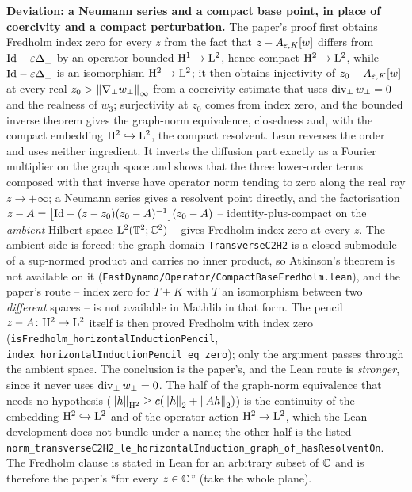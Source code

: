 \textbf{Deviation: a Neumann series and a compact base point, in place of coercivity and a
compact perturbation.}  The paper's proof first obtains Fredholm index zero for every $z$
from the fact that $z-A_{\varepsilon,K}[w]$ differs from $\mathrm{Id}-\varepsilon\Delta_\perp$ by an operator
bounded $\mathrm{H}^1\to\mathrm{L}^2$, hence compact $\mathrm{H}^2\to\mathrm{L}^2$, while $\mathrm{Id}-\varepsilon\Delta_\perp$ is an
isomorphism $\mathrm{H}^2\to\mathrm{L}^2$; it then obtains injectivity of $z_0-A_{\varepsilon,K}[w]$ at every
real $z_0>\left\|\nabla_\perp w_\perp\right\|_\infty$ from a coercivity estimate that uses
$\operatorname{div}_\perp w_\perp=0$ and the realness of $w_3$; surjectivity at $z_0$ comes from index
zero, and the bounded inverse theorem gives the graph-norm equivalence, closedness and,
with the compact embedding $\mathrm{H}^2\hookrightarrow\mathrm{L}^2$, the compact resolvent.  Lean
reverses the order and uses neither ingredient.  It inverts the diffusion part exactly as a Fourier multiplier on the graph
space and shows that the three lower-order terms composed with that inverse have operator
norm tending to zero along the real ray $z\to+\infty$; a Neumann series gives a resolvent
point directly, and the factorisation
$z-A=\bigl[\mathrm{Id}+(z-z_0)(z_0-A)^{-1}\bigr](z_0-A)$ -- identity-plus-compact on the
\emph{ambient} Hilbert space $\mathrm{L}^2(\mathbb{T}^2;\mathbb{C}^2)$ -- gives Fredholm index zero at every $z$.
The ambient side is forced: the graph domain \texttt{TransverseC2H2} is a closed submodule
of a sup-normed product and carries no inner product, so Atkinson's theorem is not available
on it (\texttt{FastDynamo/Operator/CompactBaseFredholm.lean}), and the paper's route --
index zero for $T+K$ with $T$ an isomorphism between two \emph{different} spaces -- is not
available in Mathlib in that form.  The pencil $z-A\colon\mathrm{H}^2\to\mathrm{L}^2$ itself is then
proved Fredholm with index zero
(\texttt{isFredholm\_horizontalInductionPencil},
\texttt{index\_horizontalInductionPencil\_eq\_zero}); only the argument passes through the
ambient space.  The conclusion is the paper's, and the Lean route
is \emph{stronger}, since it never uses $\operatorname{div}_\perp w_\perp=0$.  The half of the
graph-norm equivalence that needs no hypothesis
($\left\|h\right\|_{\mathrm{H}^2}\geq c(\left\|h\right\|_2+\left\|A h\right\|_2)$) is the continuity of the embedding
$\mathrm{H}^2\hookrightarrow\mathrm{L}^2$ and of the operator action $\mathrm{H}^2\to\mathrm{L}^2$, which the Lean
development does not bundle under a name; the other half is the listed
\texttt{norm\_transverseC2H2\_le\_horizontalInduction\_graph\_of\_hasResolventOn}.  The
Fredholm clause is stated in Lean for an arbitrary subset of $\mathbb{C}$ and is therefore the
paper's ``for every $z\in\mathbb{C}$'' (take the whole plane).

